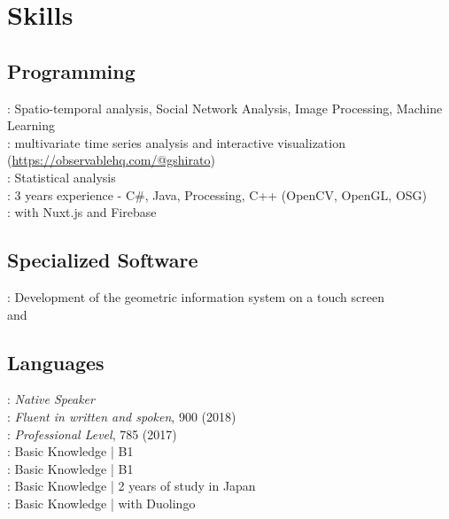 
\vspace{0.3cm}
\section{Skills}
\subsection{Programming}
\textbullet{} : Spatio-temporal analysis, Social Network Analysis, Image Processing, Machine Learning\\
\textbullet{} : multivariate time series analysis and interactive visualization (\url{https://observablehq.com/@gshirato})\\

\textbullet{} : Statistical analysis \\
\textbullet{} : 3 years experience - C\#, Java, Processing, C++ (OpenCV, OpenGL, OSG) \\
\textbullet{} : with Nuxt.js and Firebase \\
\sectionsep
\subsection{Specialized Software}
\textbullet{} : Development of the geometric information system on a touch screen \\
\textbullet{}  and \\
\sectionsep

\subsection{Languages}

\textbullet{} : \emph{Native Speaker} \\
\textbullet{} : \emph{Fluent in written and spoken}, \href{https://www.etsglobal.org/}{} 900 (2018) \\
\textbullet{} : \emph{Professional Level},  785 (2017) \\
\textbullet{} : Basic Knowledge | B1 \\
\textbullet{} : Basic Knowledge | B1 \\
\textbullet{} : Basic Knowledge | 2 years of study in Japan \\
\textbullet{} : Basic Knowledge | with Duolingo \\
\sectionsep




\sectionsep